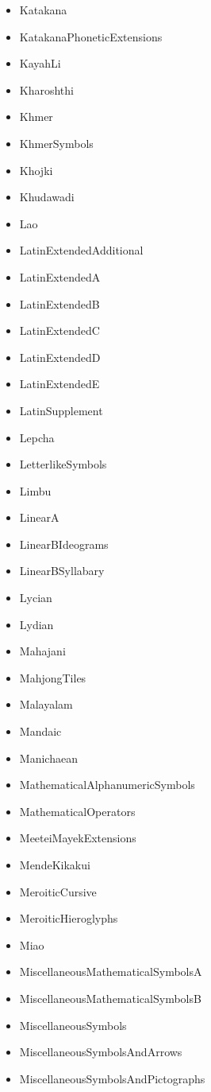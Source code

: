 ﻿\documentclass{article}
\newenvironment{itemlist}{%
  \begin{itemize}
	\setlength{\itemsep}{0pt}
	\setlength{\parsep}{0pt}
	\setlength{\topsep}{0pt}
	\setlength{\partopsep}{0pt}
	\setlength{\parskip}{0pt}
	\setlength{\labelsep}{5pt}}%
{
  \end{itemize}}
\begin{document}
\begin{multicols}{2}
\begin{itemlist}
				\item Katakana
				\item KatakanaPhoneticExtensions
				\item KayahLi
				\item Kharoshthi
				\item Khmer
				\item KhmerSymbols
				\item Khojki
				\item Khudawadi
				\item Lao
				\item LatinExtendedAdditional
				\item LatinExtendedA
				\item LatinExtendedB
				\item LatinExtendedC
				\item LatinExtendedD
				\item LatinExtendedE
				\item LatinSupplement
				\item Lepcha
				\item LetterlikeSymbols
				\item Limbu
				\item LinearA
				\item LinearBIdeograms
				\item LinearBSyllabary
				\item Lycian
				\item Lydian
				\item Mahajani
				\item MahjongTiles
				\item Malayalam
				\item Mandaic
				\item Manichaean
				\item MathematicalAlphanumericSymbols
				\item MathematicalOperators
				\item MeeteiMayekExtensions
				\item MendeKikakui
				\item MeroiticCursive
				\item MeroiticHieroglyphs
				\item Miao
				\item MiscellaneousMathematicalSymbolsA
				\item MiscellaneousMathematicalSymbolsB
				\item MiscellaneousSymbols
				\item MiscellaneousSymbolsAndArrows
				\item MiscellaneousSymbolsAndPictographs

\end{itemlist}
\end{multicols}
\end{document}
